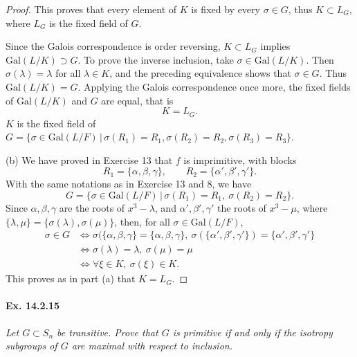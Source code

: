 \documentclass[11pt,a4paper]{article}
\newcommand{\Gal}{\mathrm{Gal}}
\begin{document}
\begin{proof}
This proves that every element of $K$ is fixed by every $\sigma \in G$, thus $K \subset L_G$, where $L_G$ is the fixed field of $G$.

Since the Galois correspondence is order reversing, $K \subset L_G$ implies $\Gal(L/K) \supset G$. To prove the inverse inclusion, take $\sigma \in \Gal(L/K)$. Then $\sigma(\lambda) = \lambda$ for all $\lambda \in K$, and the preceding equivalence shows that $\sigma \in G$. Thus $\Gal(L/K) = G$. Applying the Galois correspondence once more, the fixed fields of $\Gal(L/K)$ and $G$ are equal, that is
$$K = L_G.$$
$K$ is the fixed field of $G =  \{\sigma \in \Gal(L/F)\, | \, \sigma(R_1) = R_1,\sigma(R_2) = R_2, \sigma(R_3) = R_3 \}$.

\item[(b)] We have proved in Exercise 13 that $f$ is imprimitive, with blocks
$$R_1 = \{\alpha, \beta, \gamma\},\qquad R_2 = \{\alpha',\beta',\gamma'\}.$$
With the same notations as in Exercise 13 and 8, we have 
$$G = \{\sigma \in \Gal(L/F) \,|\, \sigma(R_1) = R_1,\ \sigma(R_2) = R_2\}.$$
Since $\alpha,\beta,\gamma$ are the roots of $x^3 -\lambda$, and $\alpha',\beta',\gamma'$ the roots of $x^3 -\mu$, where $\{\lambda, \mu\} = \{\sigma(\lambda), \sigma(\mu)\}$, then, for all $\sigma \in \Gal(L/F)$,
\begin{align*}
\sigma \in G &\iff \sigma(\{\alpha,\beta, \gamma\} = \{\alpha,\beta,\gamma\},\  \sigma(\{\alpha',\beta', \gamma'\}) = \{\alpha',\beta',\gamma'\}\\
&\iff \sigma(\lambda) = \lambda,\ \sigma(\mu) = \mu\\
&\iff \forall \xi \in K,\ \sigma(\xi) \in K.
\end{align*}
This proves as in part (a) that $K = L_G$.
\end{proof}


\paragraph{Ex. 14.2.15}{\it
Let $G \subset S_n$ be transitive. Prove that $G$ is primitive if and only if the isotropy subgroups of $G$ are maximal with respect to inclusion.
}
\end{document}
